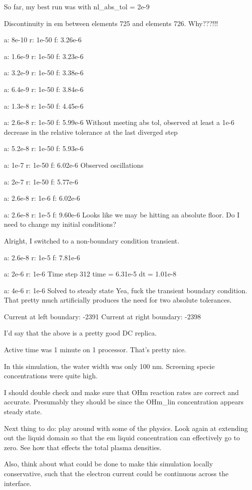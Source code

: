 {So far, my best run was with nl_abs_tol = 2e-9

Discontinuity in em between elements 725 and elements 726. Why???!!!

a: 8e-10
r: 1e-50
f: 3.26e-6

a: 1.6e-9
r: 1e-50
f: 3.23e-6

a: 3.2e-9
r: 1e-50
f: 3.38e-6

a: 6.4e-9
r: 1e-50
f: 3.84e-6

a: 1.3e-8
r: 1e-50
f: 4.45e-6

a: 2.6e-8
r: 1e-50
f: 5.99e-6
Without meeting abs tol, observed at least a 1e-6 decrease in the relative tolerance at the last diverged step

a: 5.2e-8
r: 1e-50
f: 5.93e-6

a: 1e-7
r: 1e-50
f: 6.02e-6
Observed oscillations

a: 2e-7
r: 1e-50
f: 5.77e-6

a: 2.6e-8
r: 1e-6
f: 6.02e-6

a: 2.6e-8
r: 1e-5
f: 9.60e-6
Looks like we may be hitting an absolute floor. Do I need to change my initial conditions?

Alright, I switched to a non-boundary condition transient.

a: 2.6e-8
r: 1e-5
f: 7.81e-6

a: 2e-6
r: 1e-6
Time step 312
time = 6.31e-5
dt = 1.01e-8

a: 4e-6
r: 1e-6
Solved to steady state
Yea, fuck the transient boundary condition. That pretty much artificially produces the need for two absolute tolerances.

Current at left boundary: -2391
Current at right boundary: -2398

I'd say that the above is a pretty good DC replica.

Active time was 1 minute on 1 processor. That's pretty nice.

In this simulation, the water width was only 100 nm. Screening specie concentrations were quite high.

I should double check and make sure that OHm reaction rates are correct and accurate. Presumably they should be since the OHm_lin concentration appears steady state.

Next thing to do: play around with some of the physics. Look again at extending out the liquid domain so that the em liquid concentration can effectively go to zero. See how that effects the total plasma densities.

Also, think about what could be done to make this simulation locally conservative, such that the electron current could be continuous across the interface.

}
